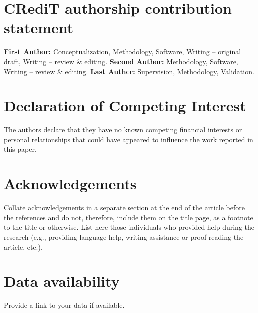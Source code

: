 \documentclass[review]{elsarticle}
\begin{document}
	\section*{CRediT authorship contribution statement}
	\textbf{First Author:} Conceptualization, Methodology, Software, Writing – original draft, Writing – review \& editing. \textbf{Second Author:} Methodology, Software, Writing – review \& editing. \textbf{Last Author:} Supervision, Methodology, Validation.
	\begin{comment}
		For transparency, we require corresponding authors to provide co-author contributions to the manuscript using the relevant CRediT roles. The CRediT taxonomy includes 14 different roles describing each contributor’s specific contribution to the scholarly output. The roles are: Conceptualization; Data curation; Formal analysis; Funding acquisition; Investigation; Methodology; Project administration; Resources; Software; Supervision; Validation; Visualization; Roles/Writing - original draft; and Writing - review & editing. Note that not all roles may apply to every manuscript, and authors may have contributed through multiple roles.
	\end{comment}
	
	
	\section*{Declaration of Competing Interest}
	The authors declare that they have no known competing financial interests or personal relationships that could have appeared to influence the work reported in this paper.
	
	\section*{Acknowledgements}
	Collate acknowledgements in a separate section at the end of the article before the references and do not, therefore, include them on the title page, as a footnote to the title or otherwise. List here those individuals who provided help during the research (e.g., providing language help, writing assistance or proof reading the article, etc.).
	
	\section*{Data availability}
	Provide a link to your data if available.
	
	
	
\end{document}

